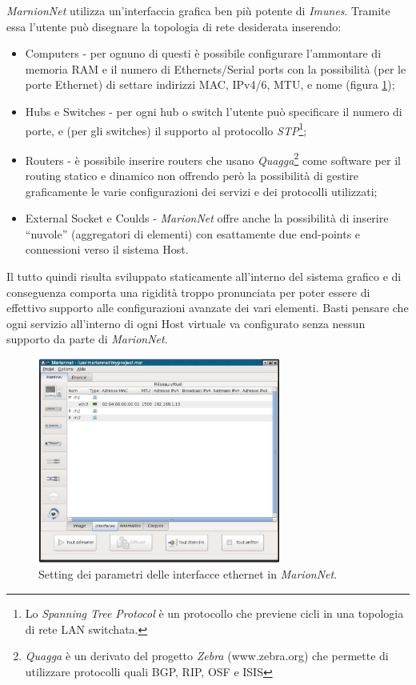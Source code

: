 \emph{MarnionNet} utilizza un'interfaccia grafica ben più potente di \emph{Imunes}. Tramite essa l'utente può disegnare\cite{MVNL08} la topologia di rete desiderata inserendo:
\begin{itemize}
 \item Computers - per ognuno di questi è possibile configurare l'ammontare di memoria RAM e il numero di Ethernets/Serial ports con la possibilità (per le porte Ethernet) di settare indirizzi MAC, IPv4/6, MTU, e nome (figura \ref{figura:marionnet_interfaces});
 \item Hubs e Switches - per ogni hub o switch l'utente può specificare il numero di porte, e (per gli switches) il supporto al protocollo \emph{STP}\footnote{Lo \emph{Spanning Tree Protocol} è un protocollo che previene cicli in una topologia di rete LAN switchata.};
 \item Routers - è possibile inserire routers che usano \emph{Quagga}\footnote{\emph{Quagga} è un derivato del progetto \emph{Zebra} (www.zebra.org) che permette di utilizzare protocolli quali BGP, RIP, OSF e ISIS} come software per il routing statico e dinamico non offrendo però la possibilità di gestire graficamente le varie configurazioni dei servizi e dei protocolli utilizzati;
 \item External Socket e Coulds - \emph{MarionNet} offre anche la possibilità di inserire ``nuvole'' (aggregatori di elementi) con esattamente due end-points e connessioni verso il sistema Host.
\end{itemize}

Il tutto quindi risulta sviluppato staticamente all'interno del sistema grafico e di conseguenza comporta una rigidità troppo pronunciata per poter essere di effettivo supporto alle configurazioni avanzate dei vari elementi. Basti pensare che ogni servizio all'interno di ogni Host virtuale va configurato senza nessun supporto da parte di \emph{MarionNet}.

\begin{figure}[!ht]
	\centering
	\includegraphics[width=8cm]{images/marionnet_interfaces.png}
	\caption{Setting dei parametri delle interfacce ethernet in \emph{MarionNet}.}
	\label{figura:marionnet_interfaces}
\end{figure}

